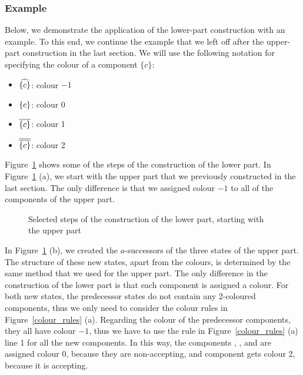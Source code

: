 \subsubsection{Example}
Below, we demonstrate the application of the lower-part construction with an example. To this end, we continue the example that we left off after the upper-part construction in the last section. We will use the following notation for specifying the colour of a component $\{c\}$:
\begin{itemize}
\item $\cl^{\{c\}}$: colour $-1$
\item $\cl0{\{c\}}$: colour 0   %
\item $\cl1{\{c\}}$: colour 1   %
\item $\cl2{\{c\}}$: colour 2
\end{itemize}

Figure~\ref{steps_lower} shows some of the steps of the construction of the lower part. In Figure~\ref{steps_lower} (a), we start with the upper part that we previously constructed in the last section. The only difference is that we assigned colour $-1$ to all of the components of the upper part.

\begin{figure}[htb]
\centering
  \begin{subfigure}[t]{0.49\textwidth}
  \centering
  \ComplementA
  \caption{}
  \end{subfigure}
  \hfill
  \begin{subfigure}[t]{0.49\textwidth}
  \centering
  \ComplementB
  \caption{}
  \end{subfigure}

  \begin{subfigure}[t]{0.49\textwidth}
  \centering
  \ComplementC
  \caption{}
  \end{subfigure}
  \hfill
  \begin{subfigure}[t]{0.49\textwidth}
  \centering
  \ComplementD
  \caption{}
  \end{subfigure}
\caption{Selected steps of the construction of the lower part, starting with the upper part }
\label{steps_lower}
\end{figure}

In Figure~\ref{steps_lower} (b), we created the $a$-successors of the three states of the upper part. The structure of these new states, apart from the colours, is determined by the same method that we used for the upper part. The only difference in the construction of the lower part is that each component is assigned a colour. For both new states, the predecessor states do not contain any 2-coloured components, thus we only need to consider the colour rules in Figure~\ref{colour_rules} (a). Regarding the colour of the predecessor components, they all have colour $-1$, thus we have to use the rule in Figure~\ref{colour_rules} (a) line 1 for all the new components. In this way, the components , , and  are assigned colour 0, because they are non-accepting, and component  gets colour 2, because it is accepting.

